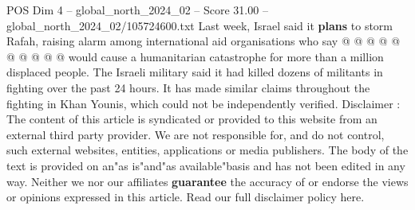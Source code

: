 \begin{textsample}{POS Dim 4 – global\_north\_2024\_02 – Score 31.00 – global\_north\_2024\_02/105724600.txt}
Last week, Israel said it \textbf{plans} to storm Rafah, raising alarm among international aid organisations who say @ @ @ @ @ @ @ @ @ @ would cause a humanitarian catastrophe for more than a million displaced people.
The Israeli military said it had killed dozens of militants in fighting over the past 24 hours.
It has made similar claims throughout the fighting in Khan Younis, which could not be independently verified.
Disclaimer : The content of this article is syndicated or provided to this website from an external third party provider.
We are not responsible for, and do not control, such external websites, entities, applications or media publishers.
The body of the text is provided on an"as is"and"as available"basis and has not been edited in any way.
Neither we nor our affiliates \textbf{guarantee} the accuracy of or endorse the views or opinions expressed in this article.
Read our full disclaimer policy here.

\end{textsample}
